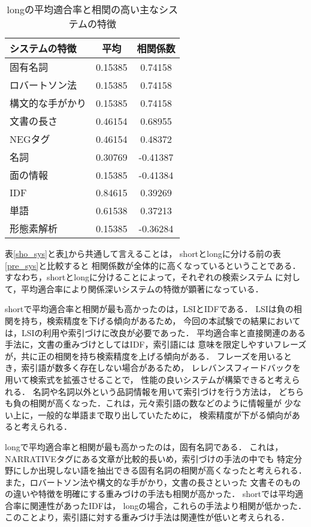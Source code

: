 \begin{table}[t]
\renewcommand{\arraystretch}{}
\caption{longの平均適合率と相関の高い主なシステムの特徴}
\centering
\small
\label{lon_sys}
\begin{tabular}{lcc} 
システムの特徴 		&   平均  & 相関係数 \\ \hline
固有名詞    		& 0.15385 &  0.74158 \\
ロバートソン法  	& 0.15385 &  0.74158 \\
構文的な手がかり	& 0.15385 &  0.74158 \\
文書の長さ		& 0.46154 &  0.68955 \\
NEGタグ			& 0.46154 &  0.48372 \\
名詞	 		& 0.30769 & -0.41387 \\
面の情報 		& 0.15385 & -0.41384 \\
IDF	 		& 0.84615 &  0.39269 \\
単語		 	& 0.61538 &  0.37213 \\
形態素解析		& 0.15385 & -0.36284 \\ \hline
\end{tabular}
\end{table}

表\ref{sho_sys}と表\ref{lon_sys}から共通して言えることは，
shortとlongに分ける前の表\ref{pre_sys}と比較すると
相関係数が全体的に高くなっているということである．
すなわち，shortとlongに分けることによって，それぞれの検索システム
に対して，平均適合率により関係深いシステムの特徴が顕著になっている．


shortで平均適合率と相関が最も高かったのは，LSIとIDFである．
LSIは負の相関を持ち，検索精度を下げる傾向があるため，
今回の本試験での結果においては，LSIの利用や索引づけに改良が必要であった．
平均適合率と直接関連のある手法に，文書の重みづけとしてはIDF，索引語には
意味を限定しやすいフレーズが，共に正の相関を持ち検索精度を上げる傾向がある．
フレーズを用いるとき，索引語が数多く存在しない場合があるため，
レレバンスフィードバックを用いて検索式を拡張させることで，
性能の良いシステムが構築できると考えられる．
名詞や名詞以外という品詞情報を用いて索引づけを行う方法は，
どちらも負の相関が高くなった．これは，元々索引語の数などのように情報量が
少ない上に，一般的な単語まで取り出していたために，
検索精度が下がる傾向があると考えられる．

longで平均適合率と相関が最も高かったのは，固有名詞である．
これは，NARRATIVEタグにある文章が比較的長いめ，索引づけの手法の中でも
特定分野にしか出現しない語を抽出できる固有名詞の相関が高くなったと考えられる．
また，ロバートソン法や構文的な手がかり，文書の長さといった
文書そのものの違いや特徴を明確にする重みづけの手法も相関が高かった．
shortでは平均適合率に関連性があったIDFは，
longの場合，これらの手法より相関が低かった．
このことより，索引語に対する重みづけ手法は関連性が低いと考えられる．

